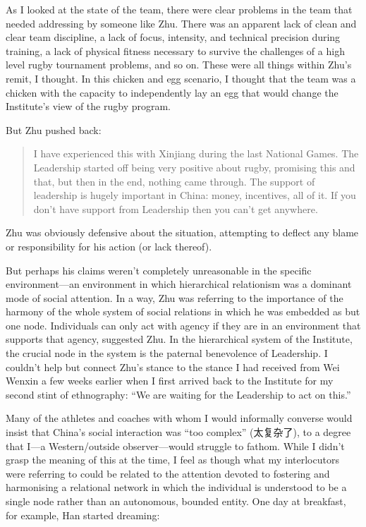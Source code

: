 \begin{CJK}{UTF8}{gbsn}
As I looked at the state of the team, there were clear problems in the team that needed addressing by someone like Zhu.  There was an apparent lack of clean and clear team discipline, a lack of focus, intensity, and technical precision during training, a lack of physical fitness necessary to survive the challenges of a high level rugby tournament problems, and so on.  These were all things within Zhu's remit, I thought.  In this chicken and egg scenario, I thought that the team was a chicken with the capacity to independently lay an egg that would change the Institute's view of the rugby program.

But Zhu pushed back:

    \begin{quotation}
      I have experienced this with Xinjiang during the last National Games. The Leadership started off being very positive about rugby, promising this and that, but then in the end, nothing came through.  The support of leadership is hugely important in China: money, incentives, all of it.  If you don't have support from Leadership then you can't get anywhere.
    \end{quotation}

Zhu was obviously defensive about the situation, attempting to deflect any blame or responsibility for his action (or lack thereof).

But perhaps his claims weren't completely unreasonable in the specific environment---an environment in which hierarchical relationism was a dominant mode of social attention.  In a way, Zhu was referring to the importance of the harmony of the whole system of social relations in which he was embedded as but one node. Individuals can only act with agency if they are in an environment that supports that agency, suggested Zhu. In the hierarchical system of the Institute, the crucial node in the system is the paternal benevolence of Leadership.  I couldn't help but connect Zhu's stance to the stance I had received from Wei Wenxin a few weeks earlier when I first arrived back to the Institute for my second stint of ethnography: ``We are waiting for the Leadership to act on this.''

Many of the athletes and coaches with whom I would informally converse would insist that China's social interaction was ``too complex'' (太复杂了), to a degree that I---a Western/outside observer---would struggle to fathom.  While I didn't grasp the meaning of this at the time, I feel as though what my interlocutors were referring to could be related to the attention devoted to fostering and harmonising a relational network in which the individual is understood to be a single node rather than an autonomous, bounded entity. One day at breakfast, for example, Han started dreaming:


\end{CJK}
